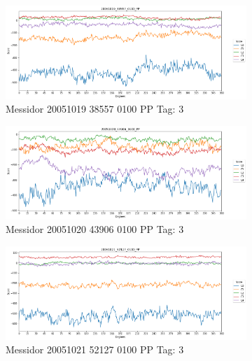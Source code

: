 \begin{figure}[ht!]
	\centering
	\begin{subfigure}[b]{ 0.85\textwidth}
		\centering
		\includegraphics[width=\textwidth]{Figures/chapter_stability/20051019_38557_0100_PP/r/scores.png}
		\caption{Messidor 20051019 38557 0100 PP Tag: 3}				
	\end{subfigure}	
	\begin{subfigure}[b]{ 0.85\textwidth}
		\centering
		\includegraphics[width=\textwidth]{Figures/chapter_stability/20051020_43906_0100_PP/r/scores.png}
		\caption{Messidor 20051020 43906 0100 PP Tag: 3}				
	\end{subfigure}	
	\begin{subfigure}[b]{ 0.85\textwidth}
		\centering
		\includegraphics[width=\textwidth]{Figures/chapter_stability/20051021_52127_0100_PP/r/scores.png}
		\caption{Messidor 20051021 52127 0100 PP Tag: 3}				
	\end{subfigure}	
	\begin{subfigure}[b]{ 0.85\textwidth}

\end{subfigure}
\end{figure}
